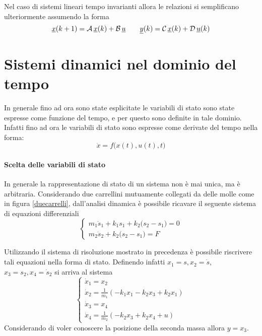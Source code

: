  		Nel caso di sistemi lineari tempo invarianti allora le relazioni si semplificano ulteriormente assumendo la forma
 		\[\underline{x}(k+1) = \mathcal A \,\underline{x}(k) + \mathcal B \,\underline{u} \qquad\underline{y}(k) = \mathcal C \,\underline{x}(k) + \mathcal D\,\underline{u}(k)  \]
 		
 	
\section{Sistemi dinamici nel dominio del tempo}
	In generale fino ad ora sono state esplicitate le variabili di stato sono state espresse come funzione del tempo, e per questo sono definite in tale dominio. Infatti fino ad ora le variabili di stato sono espresse come derivate del tempo nella forma:
	\[  \dot x = f\Big(x(t), u(t), t\Big) \]
	
	\paragraph{Scelta delle variabili di stato} In generale la rappresentazione di stato di un sistema non è mai unica, ma è arbitraria. Considerando due carrellini mutuamente collegati da delle molle come in figura \ref{duecarrelli}, dall'analisi dinamica è possibile ricavare il seguente sistema di equazioni differenziali
	\[ \begin{cases}
		m_1 \ddot s_1 + k_1 s_1 + k_2\big(s_2-s_1\big)  = 0 \\
		m_2\ddot s_2 + k_2\big(s_2-s_1\big) = F
	\end{cases} \]
 	
 	Utilizzando il sistema di risoluzione mostrato in precedenza è possibile riscrivere tali equazioni nella forma di stato. Definendo infatti $x_1=s,x_2 =\dot s$, $x_3 = s_2, x_4 = \dot s_2$ si arriva al sistema
 	\[ \begin{cases}
 		\dot x_1 = x_2 \\ 
 		\dot x_2 = \frac 1 {m_1}\left(-k_1x_1 - k_2x_3 +k_2x_1\right) \\
 		\dot x_3 = x_4 \\
 		\dot x_4 = \frac 1 {m_2}\left(-k_2x_3+k_2x_4 + u\right)
 	\end{cases} \]
 	Considerando di voler conoscere la posizione della seconda massa allora $y = x_3$.
 	
